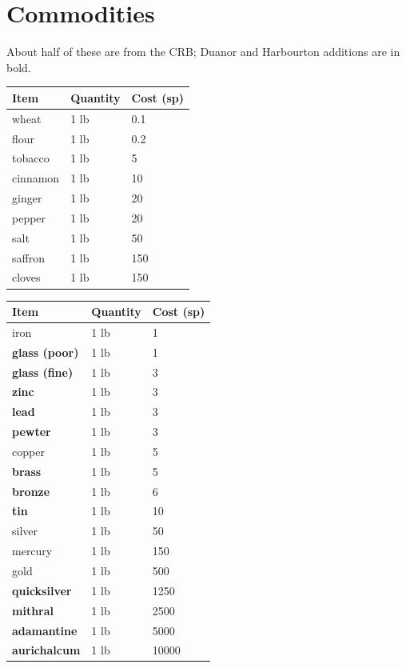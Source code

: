 %
%
\section{Commodities}

About half of these are from the CRB; Duanor and Harbourton additions are
in bold.

\begin{tabular}{lll}\hline
\textbf{Item} & \textbf{Quantity} & \textbf{Cost (sp)} \\ \hline
wheat & 1 lb & 0.1 \\
flour & 1 lb & 0.2 \\
tobacco & 1 lb & 5 \\
cinnamon & 1 lb & 10 \\
ginger & 1 lb & 20 \\
pepper & 1 lb & 20 \\
salt & 1 lb & 50 \\
saffron & 1 lb & 150 \\
cloves & 1 lb & 150 \\
\hline
\end{tabular}

\begin{tabular}{lll}\hline
\textbf{Item} & \textbf{Quantity} & \textbf{Cost (sp)} \\ \hline
iron & 1 lb & 1 \\
\textbf{glass (poor)} & 1 lb & 1 \\
\textbf{glass (fine)} & 1 lb & 3 \\
\textbf{zinc} & 1 lb & 3 \\
\textbf{lead} & 1 lb & 3 \\
\textbf{pewter} & 1 lb & 3 \\
copper & 1 lb & 5 \\
\textbf{brass} & 1 lb & 5 \\
\textbf{bronze} & 1 lb & 6 \\
\textbf{tin} & 1 lb & 10 \\
silver & 1 lb & 50 \\
mercury & 1 lb & 150 \\
gold & 1 lb & 500 \\
\textbf{quicksilver} & 1 lb & 1250 \\
\textbf{mithral} & 1 lb & 2500 \\
\textbf{adamantine} & 1 lb & 5000 \\
\textbf{aurichalcum} & 1 lb & 10000 \\
\hline
\end{tabular}

